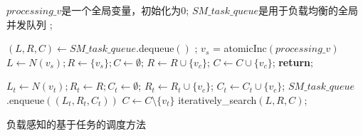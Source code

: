 \begin{algorithm} [H]
  \begin{algorithmic}[1]
    \normalsize

    \STATE $processing\_v$是一个全局变量，初始化为0;
    \STATE $SM\_task\_queue$是用于负载均衡的全局并发队列 ;
  
    \renewcommand{\algorithmicwhile}{\textbf{procedure}}
    \renewcommand{\algorithmicdo}{\textbf{:}}

    \renewcommand{\algorithmicwhile}{\textbf{while}}
    \renewcommand{\algorithmicdo}{\textbf{do}}
          \STATE $(L,R,C) \leftarrow SM\_task\_queue$\textsf{.dequeue}$()$ ;
        \ELSE
          \STATE $v_s$ = \textsf{atomicInc}$(processing\_v)$
            \STATE $L \leftarrow N(v_s); R\leftarrow\{v_s\}; C\leftarrow \emptyset $;
                \STATE $R \leftarrow R \cup \{v_c\}$;
                \STATE $C \leftarrow C \cup \{v_c\}$;
              \ENDIF
            \ENDFOR
          \ELSE
            \STATE \textbf{return};
          \ENDIF
        \ENDIF

              \STATE $L_t \leftarrow N(v_t); R_t\leftarrow R; C_t\leftarrow \emptyset $;
                  \STATE $R_t \leftarrow R_t \cup \{v_c\}$;
                  \STATE $C_t \leftarrow C_t \cup \{v_c\}$;
                \ENDIF
              \ENDFOR
              \STATE $SM\_task\_queue$\textsf{.enqueue}$((L_t, R_t, C_t))$
              \STATE $C \leftarrow C \setminus \{v_t\}$\;
            \ENDFOR
          \ELSE
            \STATE \textsf{iteratively\_search}$(L,R,C)$;
          \ENDIF

        \ENDIF
      \ENDWHILE
    \ENDWHILE 

  \end{algorithmic}
  \caption{负载感知的基于任务的调度方法}
  \label{alg:gmbe_task_full}
\end{algorithm}